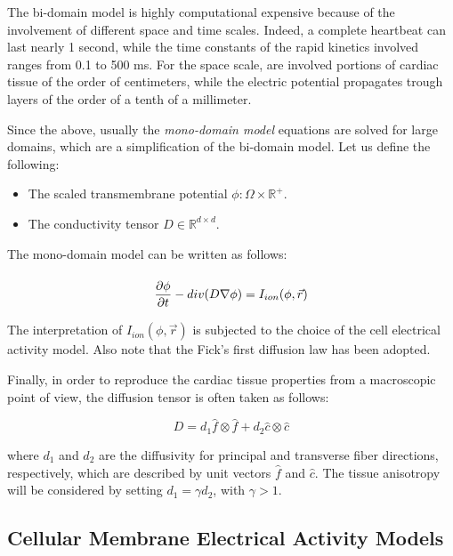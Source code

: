 The bi-domain model is highly computational expensive because of the involvement of different space and time scales. Indeed, a complete heartbeat can last nearly 1 second, while the time constants of the rapid kinetics involved ranges from 0.1 to 500 ms. For the space scale, are involved portions of cardiac tissue of the order of centimeters, while the electric potential propagates trough layers of the order of a tenth of a millimeter.

Since the above, usually the \textsl{mono-domain model} equations are solved for large domains, which are a simplification of the bi-domain model. Let us define the following:

\begin{itemize}
\item The scaled transmembrane potential $\phi: \Omega \times \mathbb{R^+}$.
\item The conductivity tensor $D \in \mathbb{R}^{d \times d}$.
\end{itemize}

The mono-domain model can be written as follows:

\begin{equation}
\arraycolsep=1.4pt\def\arraystretch{2.2}
\begin{array}{rl}
\dfrac{\partial \phi}{ \partial t} - div(D \nabla \phi) &= I_{ion} (\phi, \vec{r}) \\
\end{array}
\label{eq:MDE}
\end{equation}

The interpretation of $I_{ion} (\phi, \vec{r})$ is subjected to the choice of the cell electrical activity model. Also note that the Fick's first diffusion law has been adopted.

Finally, in order to reproduce the cardiac tissue properties from a macroscopic point of view, the diffusion tensor is often taken as follows:

\begin{equation}
D = d_1 \hat{f} \otimes \hat{f} + d_2 \hat{c} \otimes \hat{c} \label{eq:macroscopic_diff_tensor}
\end{equation}

where $d_1$ and $d_2$ are the diffusivity for principal and transverse fiber directions, respectively, which are described by unit vectors $\hat{f}$ and $\hat{c}$. The tissue anisotropy will be considered by setting $d_1 = \gamma                                    
d_2$, with $\gamma > 1$. 

\subsection{Cellular Membrane Electrical Activity Models}

